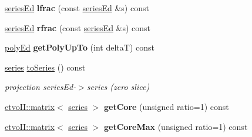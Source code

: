 \begin{DoxyCompactItemize}
\mbox{\hyperlink{classetvo_i_i_1_1series_ed}{series\+Ed}} {\bfseries lfrac} (const \mbox{\hyperlink{classetvo_i_i_1_1series_ed}{series\+Ed}} \&s) const
\item 
\mbox{\label{classetvo_i_i_1_1series_ed_a3a777586e69fb9eefd19ab2dd3eb6285}} 
\mbox{\hyperlink{classetvo_i_i_1_1series_ed}{series\+Ed}} {\bfseries rfrac} (const \mbox{\hyperlink{classetvo_i_i_1_1series_ed}{series\+Ed}} \&s) const
\item 
\mbox{\label{classetvo_i_i_1_1series_ed_a077ff3693051d2e42845615c4145231d}} 
\mbox{\hyperlink{classetvo_i_i_1_1poly_ed}{poly\+Ed}} {\bfseries get\+Poly\+Up\+To} (int deltaT) const
\item 
\mbox{\label{classetvo_i_i_1_1series_ed_a61b96fb16578e9c6b3fac992f73ba360}} 
\mbox{\hyperlink{classetvo_i_i_1_1series}{series}} \mbox{\hyperlink{classetvo_i_i_1_1series_ed_a61b96fb16578e9c6b3fac992f73ba360}{to\+Series}} () const
\begin{DoxyCompactList}\small\item\em projection series\+Ed-\/$>$series (zero slice) \end{DoxyCompactList}\item 
\mbox{\label{classetvo_i_i_1_1series_ed_ac0bc0026bddf7646f07f81ed7aa68dce}} 
\mbox{\hyperlink{classetvo_i_i_1_1matrix}{etvo\+I\+I\+::matrix}}$<$ \mbox{\hyperlink{classetvo_i_i_1_1series}{series}} $>$ {\bfseries get\+Core} (unsigned ratio=1) const
\item 
\mbox{\label{classetvo_i_i_1_1series_ed_a73138cafb1fe66d4e62fe4a33a81ac96}} 
\mbox{\hyperlink{classetvo_i_i_1_1matrix}{etvo\+I\+I\+::matrix}}$<$ \mbox{\hyperlink{classetvo_i_i_1_1series}{series}} $>$ {\bfseries get\+Core\+Max} (unsigned ratio=1) const
\end{DoxyCompactItemize}
